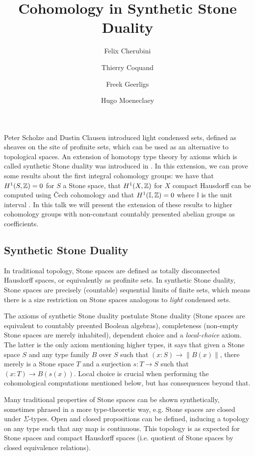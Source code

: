 \documentclass{../util/zariski}
\author{
Felix Cherubini %
\and 
 Thierry Coquand%
\and 
 Freek Geerligs%
\and
 Hugo Moeneclaey %
}
\title{Cohomology in Synthetic Stone Duality}
\begin{document}
\maketitle
Peter Scholze and Dustin Clausen \cite{Scholze} introduced light condensed sets, defined as sheaves on the site of profinite sets, which can be used as an alternative to topological spaces. 
An extension of homotopy type theory by axioms which is called synthetic Stone duality was introduced in \cite{synthetic-stone-duality}. In this extension, we can prove some results about the first integral cohomology groups: we have that $H^1(S,\mathbb{Z}) = 0$ for $S$ a Stone space, that $H^1(X,\mathbb{Z})$ for $X$ compact Hausdorff can be computed using \v{C}ech cohomology and that $H^1(\mathbb{I},\mathbb{Z}) = 0$ where $\mathbb{I}$ is the unit interval \cite{synthetic-stone-duality}. In this talk we will present the extension of these results to higher cohomology groups with non-constant countably presented abelian groups as coefficients.

\subsection*{Synthetic Stone Duality}

In traditional topology, Stone spaces are defined as totally disconnected Hausdorff spaces, or equivalently as profinite sets. In synthetic Stone duality, Stone spaces are precisely (countable) sequential limits of finite sets, which means there is a size restriction on Stone spaces analogous to \emph{light} condensed sets. 

The axioms of synthetic Stone duality postulate Stone duality (Stone spaces are equivalent to countably preented Boolean algebras), completeness (non-empty Stone spaces are merely inhabited), dependent choice and a \emph{local-choice} axiom. The latter is the only axiom mentioning higher types, it says that given a Stone space $S$ and any type family $B$ over $S$ such that $(x:S)\to \| B(x)  \|$, there merely is a Stone space $T$ and a surjection $s:T\to S$ such that $(x:T)\to B(s(x))$. Local choice is crucial when performing the cohomological computations mentioned below, but has consequences beyond that.

Many traditional properties of Stone spaces can be shown synthetically, sometimes phrased in a more type-theoretic way, e.g. Stone spaces are closed under $\Sigma$-types. Open and closed propositions can be defined, inducing a topology on any type such that any map is continuous. This topology is as expected for Stone spaces and compact Hausdorff spaces (i.e. quotient of Stone spaces by closed equivalence relations).
\end{document}
